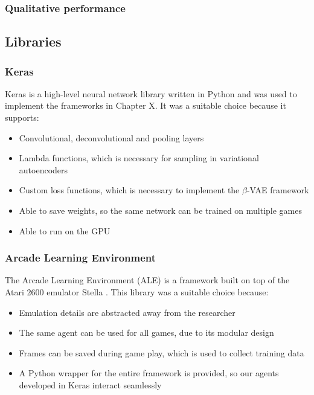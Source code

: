 \documentclass[12pt,twoside]{article}
\begin{document}
\subsubsection{Qualitative performance}

\subsection{Libraries}
\subsubsection{Keras}

Keras is a high-level neural network library written in Python \cite{Chollet2015} and was used to implement the frameworks in Chapter X. It was a suitable choice because it supports:

\begin{itemize}
\item Convolutional, deconvolutional and pooling layers
\item Lambda functions, which is necessary for sampling in variational autoencoders
\item Custom loss functions, which is necessary to implement the $\beta$-VAE framework
\item Able to save weights, so the same network can be trained on multiple games
\item Able to run on the GPU
\end{itemize}

\subsubsection{Arcade Learning Environment}
The Arcade Learning Environment (ALE) is a framework built on top of the Atari 2600 emulator Stella \cite{Bellemare2015}. This library was a suitable choice because:
\begin{itemize}
\item Emulation details are abstracted away from the researcher
\item The same agent can be used for all games, due to its modular design
\item Frames can be saved during game play, which is used to collect training data
\item A Python wrapper for the entire framework is provided, so our agents developed in Keras interact seamlessly
\end{itemize}
\end{document}
